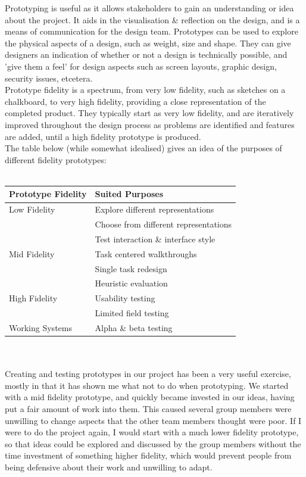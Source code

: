 \documentclass{article}
\begin{document}
\noindent Prototyping is useful as it allows stakeholders to gain an understanding or idea about the project. It aids in the visualisation \& reflection on the design, and is a means of communication for the design team. Prototypes can be used to explore the physical aspects of a design, such as weight, size and shape. They can give designers an indication of whether or not a design is technically possible, and 'give them a feel' for design aspects such as screen layouts, graphic design, security issues, etcetera.
\\\indent Prototype fidelity is a spectrum, from very low fidelity, such as sketches on a chalkboard, to very high fidelity, providing a close representation of the completed product. They typically start as very low fidelity, and are iteratively improved throughout the design process as problems are identified and features are added, until a high fidelity prototype is produced.
\\\indent The table below (while somewhat idealised) gives an idea of the purposes of different fidelity prototypes:
\\\\
\begin{tabular}{ | l | l | }
    \hline
    \textbf{Prototype Fidelity} & \textbf{Suited Purposes}              \\
    \hline
    Low Fidelity                & Explore different representations     \\
                                & Choose from different representations \\
                                & Test interaction \& interface style   \\
    \hline
    Mid Fidelity                & Task centered walkthroughs            \\
                                & Single task redesign                  \\
                                & Heuristic evaluation                  \\
    \hline
    High Fidelity               & Usability testing                     \\
                                & Limited field testing                 \\
    \hline
    Working Systems             & Alpha \& beta testing                 \\
    \hline
\end{tabular}\\
\\\indent Creating and testing prototypes in our project has been a very useful exercise, mostly in that it has shown me what not to do when prototyping. We started with a mid fidelity prototype, and quickly became invested in our ideas, having put a fair amount of work into them. This caused several group members were unwilling to change aspects that the other team members thought were poor. If I were to do the project again, I would start with a much lower fidelity prototype, so that ideas could be explored and discussed by the group members without the time investment of something higher fidelity, which would prevent people from being defensive about their work and unwilling to adapt.
\end{document}
